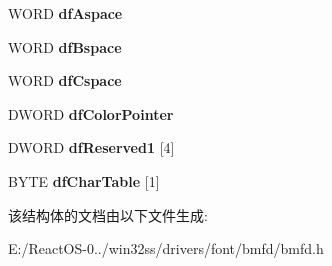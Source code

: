 \begin{DoxyCompactItemize}
W\+O\+RD {\bfseries df\+Aspace}
\item 
\mbox{\label{struct_f_o_n_t_i_n_f_o16_ac2c97d09ee7deb5bedf67ca6935fad34}} 
W\+O\+RD {\bfseries df\+Bspace}
\item 
\mbox{\label{struct_f_o_n_t_i_n_f_o16_a898da652df0938b18051fb129ae3ddaf}} 
W\+O\+RD {\bfseries df\+Cspace}
\item 
\mbox{\label{struct_f_o_n_t_i_n_f_o16_ab3ae9a8a2b4149ad5184b5496131d977}} 
D\+W\+O\+RD {\bfseries df\+Color\+Pointer}
\item 
\mbox{\label{struct_f_o_n_t_i_n_f_o16_a52592c63b63da5e5ed3be498ef245ec2}} 
D\+W\+O\+RD {\bfseries df\+Reserved1} \mbox{[}4\mbox{]}
\item 
\mbox{\label{struct_f_o_n_t_i_n_f_o16_a3a02d1a49ca69470ee6afd8c97543d11}} 
B\+Y\+TE {\bfseries df\+Char\+Table} \mbox{[}1\mbox{]}
\end{DoxyCompactItemize}


该结构体的文档由以下文件生成\+:\begin{DoxyCompactItemize}
\item 
E\+:/\+React\+O\+S-\/0../win32ss/drivers/font/bmfd/bmfd.\+h\end{DoxyCompactItemize}
